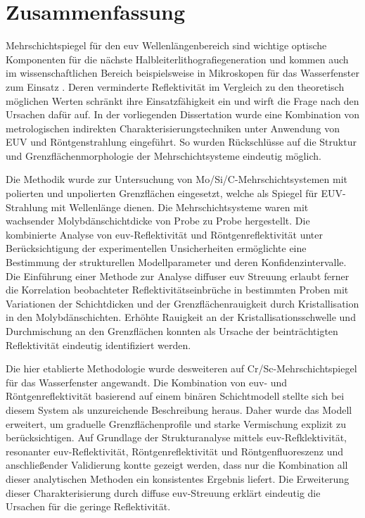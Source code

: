 \cleardoublepage

\thispagestyle{empty}

\section*{Zusammenfassung}
    
    Mehrschichtspiegel für den \gls{euv} Wellenlängenbereich sind wichtige optische Komponenten für die nächste Halbleiterlithografiegeneration und kommen auch im wissenschaftlichen Bereich beispielsweise in Mikroskopen für das Wasserfenster zum Einsatz . Deren verminderte Reflektivität im Vergleich zu den theoretisch möglichen Werten schränkt ihre Einsatzfähigkeit ein und wirft die Frage nach den Ursachen dafür auf. In der vorliegenden Dissertation wurde eine Kombination von metrologischen indirekten Charakterisierungstechniken unter Anwendung von EUV und Röntgenstrahlung eingeführt. So wurden Rückschlüsse auf die Struktur und Grenzflächenmorphologie der Mehrschichtsysteme eindeutig möglich.
    
    Die Methodik wurde zur Untersuchung von Mo/Si/C-Mehrschichtsystemen mit polierten und unpolierten Grenzflächen eingesetzt, welche als Spiegel für EUV-Strahlung mit  Wellenlänge dienen. Die Mehrschichtsysteme waren mit wachsender Molybdänschichtdicke von Probe zu Probe hergestellt. Die kombinierte Analyse von \gls{euv}-Reflektivität und Röntgenreflektivität unter Berücksichtigung der experimentellen Unsicherheiten ermöglichte eine Bestimmung der strukturellen Modellparameter und deren Konfidenzintervalle. Die Einführung einer Methode zur Analyse diffuser \gls{euv} Streuung erlaubt ferner die Korrelation beobachteter Reflektivitätseinbrüche in bestimmten Proben mit Variationen der Schichtdicken und der Grenzflächenrauigkeit durch Kristallisation in den Molybdänschichten. Erhöhte Rauigkeit an der Kristallisationsschwelle und Durchmischung an den Grenzflächen konnten als Ursache der beinträchtigten Reflektivität eindeutig identifiziert werden.
	
    Die hier etablierte Methodologie wurde desweiteren auf Cr/Sc-Mehrschichtspiegel für das Wasserfenster angewandt. Die Kombination von \gls{euv}- und Röntgenreflektivität basierend auf einem binären Schichtmodell stellte sich bei diesem System als unzureichende Beschreibung heraus. Daher wurde das Modell erweitert, um graduelle Grenzflächenprofile und starke Vermischung explizit zu berücksichtigen. Auf Grundlage der Strukturanalyse mittels \gls{euv}-Refklektivität, resonanter \gls{euv}-Reflektivität, Röntgenreflektivität und Röntgenfluoreszenz und anschließender Validierung kontte gezeigt werden, dass nur die Kombination all dieser analytischen Methoden ein konsistentes Ergebnis liefert. Die Erweiterung dieser Charakterisierung durch diffuse \gls{euv}-Streuung erklärt eindeutig die Ursachen für die geringe Reflektivität.

\cleardoublepage
